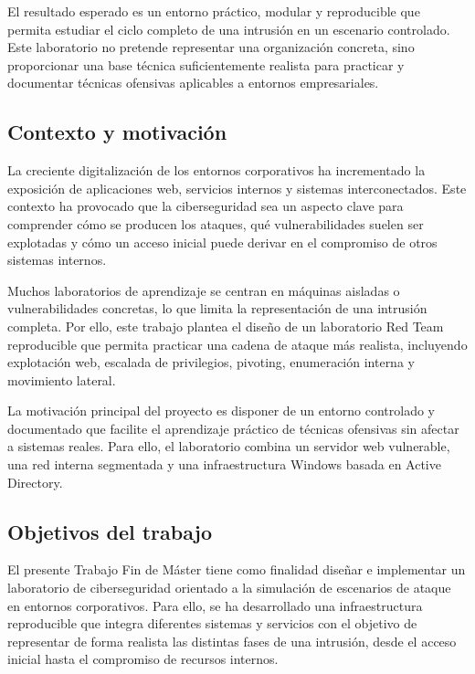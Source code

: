 El resultado esperado es un entorno práctico, modular y reproducible que permita estudiar el ciclo completo de una intrusión en un escenario controlado. Este laboratorio no pretende representar una organización concreta, sino proporcionar una base técnica suficientemente realista para practicar y documentar técnicas ofensivas aplicables a entornos empresariales.






\subsection{Contexto y motivación}

La creciente digitalización de los entornos corporativos ha incrementado la exposición de aplicaciones web, servicios internos y sistemas interconectados. Este contexto ha provocado que la ciberseguridad sea un aspecto clave para comprender cómo se producen los ataques, qué vulnerabilidades suelen ser explotadas y cómo un acceso inicial puede derivar en el compromiso de otros sistemas internos.

Muchos laboratorios de aprendizaje se centran en máquinas aisladas o vulnerabilidades concretas, lo que limita la representación de una intrusión completa. Por ello, este trabajo plantea el diseño de un laboratorio Red Team reproducible que permita practicar una cadena de ataque más realista, incluyendo explotación web, escalada de privilegios, pivoting, enumeración interna y movimiento lateral.

La motivación principal del proyecto es disponer de un entorno controlado y documentado que facilite el aprendizaje práctico de técnicas ofensivas sin afectar a sistemas reales. Para ello, el laboratorio combina un servidor web vulnerable, una red interna segmentada y una infraestructura Windows basada en Active Directory.

\subsection{Objetivos del trabajo}

El presente Trabajo Fin de Máster tiene como finalidad diseñar e implementar un laboratorio de ciberseguridad orientado a la simulación de escenarios de ataque en entornos corporativos. Para ello, se ha desarrollado una infraestructura reproducible que integra diferentes sistemas y servicios con el objetivo de representar de forma realista las distintas fases de una intrusión, desde el acceso inicial hasta el compromiso de recursos internos.

